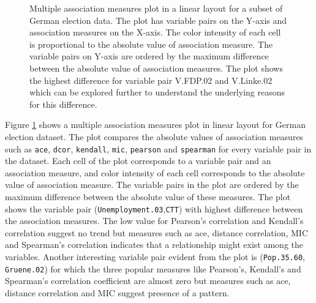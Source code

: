 \begin{Schunk}
\begin{figure}
{}

\caption[Multiple association measures plot in a linear layout for a subset of German election data]{Multiple association measures plot in a linear layout for a subset of German election data. The plot has variable pairs on the Y-axis and association measures on the X-axis. The color intensity of each cell is proportional to the absolute value of association measure. The variable pairs on Y-axis are ordered by the maximum difference between the absolute value of association measures. The plot shows the highest difference for variable pair V.FDP.02 and V.Linke.02 which can be explored further to understand the underlying reasons for this difference.}\label{fig:compare-linear-heatmap}
\end{figure}
\end{Schunk}

Figure \ref{fig:compare-linear-heatmap} shows a multiple association
measures plot in linear layout for German election dataset. The plot
compares the absolute values of association measures such as
\texttt{ace}, \texttt{dcor}, \texttt{kendall}, \texttt{mic},
\texttt{pearson} and \texttt{spearman} for every variable pair in the
dataset. Each cell of the plot corresponds to a variable pair and an
association measure, and color intensity of each cell corresponds to the
absolute value of association measure. The variable pairs in the plot
are ordered by the maximum difference between the absolute value of
these measures. The plot shows the variable pair
(\texttt{Unemployment.03},\texttt{CTT}) with highest difference between
the association measures. The low value for Pearson's correlation and
Kendall's correlation suggest no trend but measures such as ace,
distance correlation, MIC and Spearman's correlation indicates that a
relationship might exist among the variables. Another interesting
variable pair evident from the plot is (\texttt{Pop.35.60},
\texttt{Gruene.02}) for which the three popular measures like Pearson's,
Kendall's and Spearman's correlation coefficient are almost zero but
measures such as ace, distance correlation and MIC suggest presence of a
pattern.

